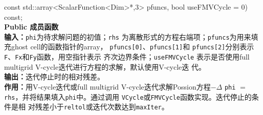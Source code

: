 \documentclass[a4paper,twoside]{ctexart}
\begin{document}
\begin{itemize}
\begin{enumerate}[(1)]
{                         const std::array<ScalarFunction<Dim>*,3> pfuncs,
             bool useFMVCycle = 0) const;}\\
          \textbf{Public 成员函数}\\
          \textbf{输入：}\texttt{phi}为待求解问题的初值；\texttt{rhs}
          为离散形式的方程右端项；\texttt{pfuncs}为用来填充ghost cell的函数指针的array，
                \texttt{pfuncs[0]}、\texttt{pfuncs[1]}和
                \texttt{pfuncs[2]}分别表示
                \texttt{F}、\texttt{Fx}和\texttt{Fy}函数，用空指针表示
                齐次边界条件；\texttt{useFMVCycle} 表示是否使用full
                multigrid V-cycle迭代进行方程的求解，默认使用V-cycle迭
                代。 \\
                \textbf{输出：}迭代停止时的相对残差。\\
                \textbf{作用：}用V-cycle迭代或full
          multigrid V-cycle迭代求解Possion方程$-\Delta$ \texttt{phi} $=$
                \texttt{rhs}，并将结果填入\texttt{phi}中。通过调用
          \texttt{VCycle}或\texttt{FMVCycle}函数实现。迭代停止的条件是相
          对残差小于\texttt{reltol}或迭代次数达到\texttt{maxIter}。
        \end{enumerate}
      \end{itemize}
\end{document}
